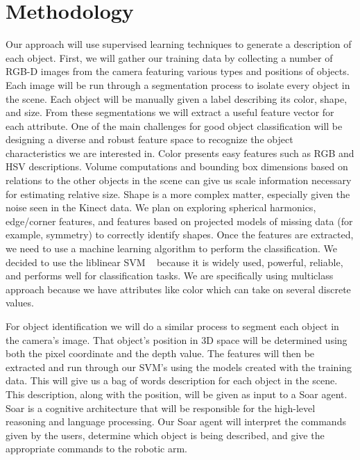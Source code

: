 \documentclass[11pt]{article}
\newcommand{\xxx}[1]{{\bf \color{red} #1}}
\begin{document}
\section{Methodology}

Our approach will use supervised learning techniques to generate a description
of each object. First, we will gather our training data by collecting a number
of RGB-D images from the camera featuring various types and positions of objects.
Each image will be run through a segmentation process to isolate every object in
the scene. Each object will be manually given a label describing its color,
shape, and size. From these segmentations we will extract a useful feature vector
for each attribute. One of the main challenges for good object classification
will be designing a diverse and robust feature space to recognize the object
characteristics we are interested in. Color presents easy features such as RGB
and HSV descriptions. Volume computations and bounding box dimensions based on
relations to the other objects in the scene can give us scale information
necessary for estimating relative size. Shape is a more complex matter,
especially given the noise seen in the Kinect data. We plan on exploring
spherical harmonics, edge/corner features, and features based on projected
models of missing data (for example, symmetry) to correctly identify shapes.
Once the features are extracted, we need to use a machine learning algorithm to
perform the classification. We decided to use the liblinear SVM ~\cite{LIBLINEAR}
because it is widely used, powerful, reliable, and performs well for
classification tasks. We are specifically using multiclass approach because we
have attributes like color which can take on several discrete values.

For object identification we will do a similar process to segment each object in
the camera's image. That object's position in 3D space will be determined using
both the pixel coordinate and the depth value. The features will then be
extracted and run through our SVM's using the models created with the training
data. This will give us a bag of words description for each object in the scene.
This description, along with the position, will be given as input to a Soar
agent. Soar is a cognitive architecture that will be responsible for the
high-level reasoning and language processing. Our Soar agent will interpret the
commands given by the users, determine which object is being described, and give
the appropriate commands to the robotic arm.
\end{document}
